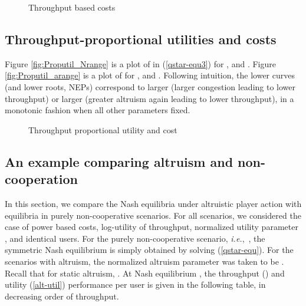 \documentclass[12pt,onecolumn,draftcls]{IEEEtran}
\newcommand{\ie}{{\em i.e.},~}
\begin{document}
\begin{figure}[ht]
\centering
{}
\caption{Throughput based costs}\label{fig:Throughput}
\end{figure}



\subsection{Throughput-proportional utilities and costs}
Figure \ref{fig:Proputil_Nrange} is a plot of  in
(\ref{qstar-equ3}) for ,  and .  Figure
\ref{fig:Proputil_arange} is a plot of  for ,  and
.  Following intuition, the lower curves (and lower roots,
NEPs) correspond to larger  (larger congestion leading to lower
throughput) or larger  (greater altruism again leading to lower
throughput), in a monotonic fashion when all other parameters fixed.

\begin{figure}[ht]
\centering
{}
\caption{Throughput proportional utility and cost}\label{fig:Proputil}
\end{figure}


\subsection{An example comparing altruism and non-cooperation}\label{anarchy-sec}

In this section, we compare the Nash equilibria under altruistic player
action with equilibria in purely non-cooperative scenarios.  For all
scenarios, we considered the case of power based costs, log-utility of
throughput, normalized utility parameter , and identical users.
For the purely non-cooperative scenario, \ie , the symmetric Nash
equilibrium  is simply obtained by solving (\ref{qstar-equ}).  For
the scenarios with altruism,  the normalized altruism parameter was taken
to be .  Recall that for static altruism, .  At Nash
equilibrium , the throughput ()
and utility (\ref{alt-util}) performance per user is given in the following
table, in decreasing order of throughput.
\end{document}
